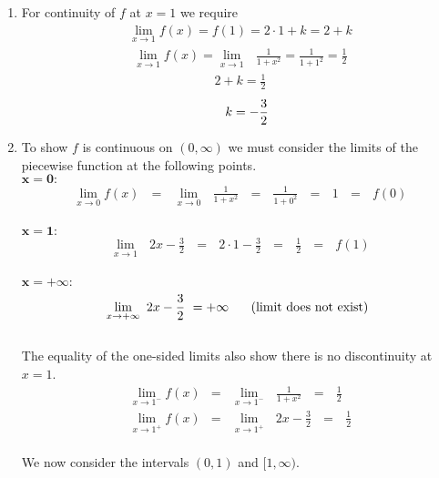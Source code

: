 \documentclass[12pt]{amsart}
\begin{document}
\begin{enumerate}
		\begin{enumerate}
		
			\item 
				For continuity of $f$ at $x=1$ we require\\
				\begin{eqnarray}
					\lim_{x \rightarrow 1} f(x) = f(1) = 2\cdot1+k=2+k \nonumber			
				\end{eqnarray}
				\begin{eqnarray}
					\lim_{x \rightarrow 1} f(x) =\lim_{x \rightarrow 1} \text{ } \frac{1}{1+x^2} =  								\frac{1}{1+1^2} = \frac{1}{2} \nonumber
				\end{eqnarray}
				\begin{eqnarray}
					2 + k  =  \frac{1}{2} \nonumber
				\end{eqnarray}
				\begin{eqnarray}
					\hspace{0.4cm} k  =  -\frac{3}{2} \nonumber
				\end{eqnarray}
				
			\item  
				To show $f$ is continuous on $(0,\infty)$ we must consider the limits of the piecewise 					function at the following points.\\
				
				{$\mathbf{x=0:}$}
				\begin{eqnarray}
					\lim_{x \rightarrow 0} f(x) \text{ } = \text{ } \lim_{x \rightarrow 0} \text{ } \frac{1}{1+x^2} 						\text{ } = \text{ } \frac{1}{1+0^2} \text{ } = \text{ } 1 \text{ } = \text{ } f(0) \nonumber
				\end{eqnarray}\\
				$\mathbf{x=1:}$
				\begin{eqnarray}
					\lim_{x \rightarrow 1} \text{ } 2x - \frac{3}{2} \text{ } = \text{ } 2 \cdot 1 - \frac{3}{2} 
					\text{ } = \text{ } \frac{1}{2} \text{ } = \text{ } f(1) \nonumber
				\end{eqnarray}\\
				$\mathbf{x=+\infty:}$
				\begin{eqnarray}
					\lim_{x \rightarrow +\infty} \text{ } 2x - \frac{3}{2} \text{ } = +\infty \hspace{0.5cm}
					\text{ (limit does not exist) } \nonumber
				\end{eqnarray}\\
				The equality of the one-sided limits also show there is no discontinuity at $x=1$. \\
				\begin{eqnarray}
					\lim_{x \rightarrow 1^-} f(x) & = &\lim_{x \rightarrow 1^-} \text{ } \frac{1}{1+x^2} \text{ } 					= \text{ } \frac{1}{2} \text{ } \nonumber \\
					\lim_{x \rightarrow 1^+} f(x) & = & \lim_{x \rightarrow 1^+} \text{ } 2x - \frac{3}{2} 
					\text{ } = \text{ } \frac{1}{2} \nonumber
				\end{eqnarray}\\
				We now consider the intervals $(0,1)$ and $[1,\infty)$.
				\\
				

\end{enumerate}
\end{enumerate}
\end{document}
